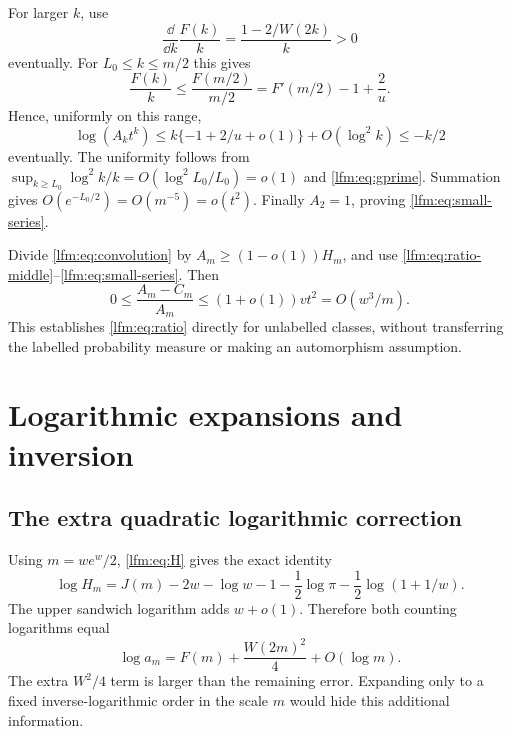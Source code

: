 \documentclass[11pt,letterpaper]{article}
\theoremstyle{remark}\newtheorem{remark}[theorem]{Remark}
\begin{document}
For larger $k$, use
\[
 \frac{\dd}{\dd k}\frac{F(k)}k
 =\frac{1-2/W(2k)}k>0
\]
eventually. For $L_0\le k\le m/2$ this gives
\[
 \frac{F(k)}k\le\frac{F(m/2)}{m/2}
 =F'(m/2)-1+\frac2u.
\]
Hence, uniformly on this range,
\[
 \log(A_kt^k)\le k\{-1+2/u+o(1)\}+O(\log^2k)\le-k/2
\]
eventually. The uniformity follows from
$\sup_{k\ge L_0}\log^2k/k=O(\log^2L_0/L_0)=o(1)$ and \eqref{lfm:eq:gprime}. Summation gives $O(e^{-L_0/2})=O(m^{-5})=o(t^2)$. Finally $A_2=1$, proving \eqref{lfm:eq:small-series}.

Divide \eqref{lfm:eq:convolution} by $A_m\ge(1-o(1))H_m$, and use \eqref{lfm:eq:ratio-middle}--\eqref{lfm:eq:small-series}. Then
\[
 0\le\frac{A_m-C_m}{A_m}\le(1+o(1))vt^2
 =O(w^3/m).
\]
This establishes \eqref{lfm:eq:ratio} directly for unlabelled classes, without transferring the labelled probability measure or making an automorphism assumption.

\section{Logarithmic expansions and inversion}\label{lfm:sec:series}
\subsection{The extra quadratic logarithmic correction}
Using $m=we^w/2$, \eqref{lfm:eq:H} gives the exact identity
\begin{equation}
 \log H_m=J(m)-2w-\log w-1-\frac12\log\pi
            -\frac12\log(1+1/w).\label{lfm:eq:logH}
\end{equation}
The upper sandwich logarithm adds $w+o(1)$. Therefore both counting logarithms equal
\[
 \boxed{\log a_m=F(m)+\frac{W(2m)^2}{4}+O(\log m).}
\]
The extra $W^2/4$ term is larger than the remaining error. Expanding only to a fixed inverse-logarithmic order in the scale $m$ would hide this additional information.
\end{document}
